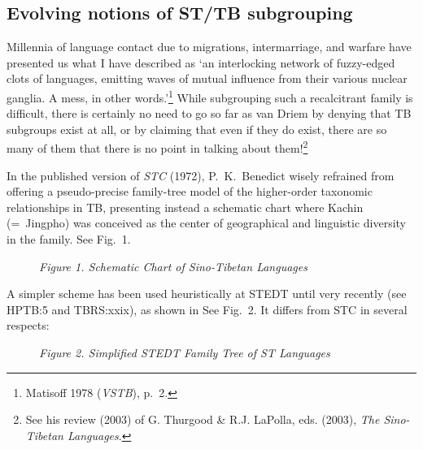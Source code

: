 \subsection{Evolving notions of ST/TB subgrouping}

Millennia of language contact due to migrations, intermarriage, and warfare have presented us what I
have described as ‘an interlocking network of fuzzy-edged clots of languages,
emitting waves of mutual influence from their various nuclear ganglia.  A mess,
in other words.’\footnote{Matisoff 1978 (\textit{VSTB}), p.~2.}  While subgrouping such
a recalcitrant family is difficult, there is certainly no need to go so far as
van Driem by denying that TB subgroups exist at all, or by claiming that even if
they do exist, there are so many of them that there is no point in talking about
them!\footnote{See his review (2003) of G. Thurgood \& R.J. LaPolla, eds. (2003),
\textit{The Sino-Tibetan Languages}.}


In the published version of \textit{STC} (1972),
P.\ K.\ Benedict wisely refrained from offering a pseudo-precise family-tree model of
the higher-order taxonomic relationships in TB, presenting instead a schematic
chart where Kachin (=~Jingpho) was conceived as the center of geographical and
linguistic diversity in the family.  See Fig.~1.

\begin{figure}[ht]
\begin{center}
\textit{Figure 1. Schematic Chart of Sino-Tibetan Languages}\footnotemark
\end{center}
\end{figure}

A simpler scheme has been used heuristically at STEDT until very recently (see HPTB:5 and TBRS:xxix), as shown in  See Fig.~2. It differs from STC in several respects:

\begin{figure}[ht]
\begin{center}
\textit{Figure 2.  Simplified STEDT Family Tree of ST Languages}
\end{center}
\end{figure}


